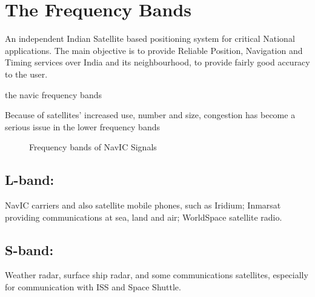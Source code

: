 




%


\section{The Frequency Bands}
An independent Indian Satellite based positioning system for critical National applications. The main objective is to provide Reliable Position, Navigation and Timing services over India and its neighbourhood, to provide fairly good accuracy to the user. 

	
	\begin{table}[h!]
	\small
	\centering
	\caption{the navic frequency bands}
	\label{table:bands}
	
	\end{table}

Because of satellites’ increased use, number and size, congestion has become a serious issue in the lower frequency bands
	\begin{figure}[h!]
	\centering
	
	\caption{Frequency bands of NavIC Signals}
	\label{figure:bandsfig}
	\end{figure}	
\subsection{L-band:}
NavIC carriers and also satellite mobile phones, such as Iridium; Inmarsat providing communications at sea, land and air; WorldSpace satellite radio.

\subsection{S-band:}
Weather radar, surface ship radar, and some communications satellites, especially for communication with ISS and Space Shuttle. 
	

